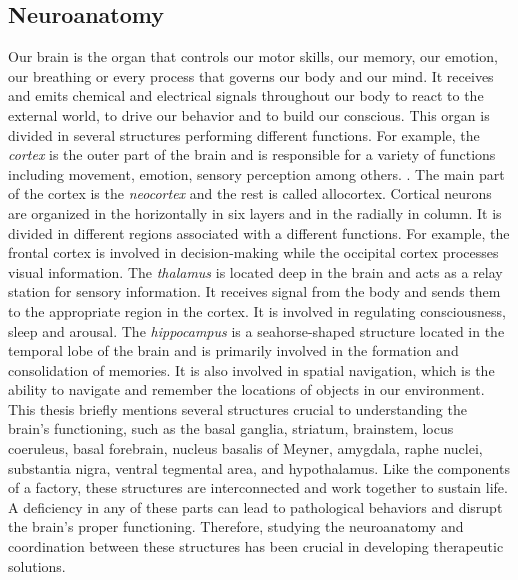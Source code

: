 \subsection{Neuroanatomy}
Our brain is the organ that controls our motor skills, our memory, our emotion, our breathing or every process that governs our body and our mind. It receives and emits chemical and electrical signals throughout our body to react to the external world, to drive our behavior and to build our conscious. This organ is divided in several structures performing different functions. For example, the \textit{cortex} is the outer part of the brain and is responsible for a variety of functions including movement, emotion, sensory perception among others. . The main part of the cortex is the \textit{neocortex} and the rest is called allocortex. Cortical neurons are organized in the horizontally in six layers and in the radially in column. It is divided in different regions associated with a different functions. For example, the frontal cortex is involved in decision-making while the occipital cortex processes visual information. The \textit{thalamus} is  located deep in the brain and acts as a relay station for sensory information. It receives signal from the body and sends them to the appropriate region in the cortex. It is involved in regulating consciousness, sleep and arousal. The \textit{hippocampus} is a seahorse-shaped structure located in the temporal lobe of the brain and is primarily involved in the formation and consolidation of memories. It is also involved in spatial navigation, which is the ability to navigate and remember the locations of objects in our environment. This thesis briefly mentions several structures crucial to understanding the brain's functioning, such as the basal ganglia, striatum, brainstem, locus coeruleus, basal forebrain, nucleus basalis of Meyner, amygdala, raphe nuclei, substantia nigra, ventral tegmental area, and hypothalamus. Like the components of a factory, these structures are interconnected and work together to sustain life. A deficiency in any of these parts can lead to pathological behaviors and disrupt the brain's proper functioning. Therefore, studying the neuroanatomy and coordination between these structures has been crucial in developing therapeutic solutions.
 




